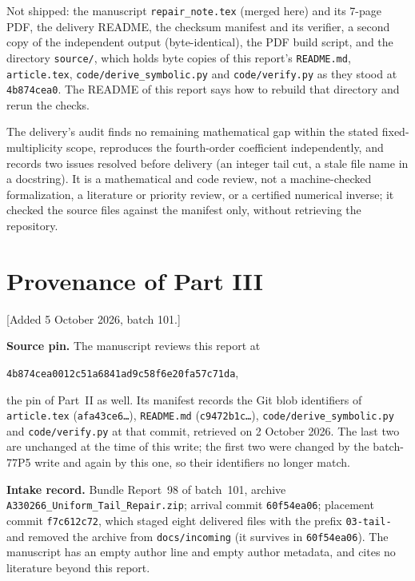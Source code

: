\documentclass[11pt,letterpaper]{article}
\theoremstyle{definition}
\theoremstyle{remark}
\begin{document}
Not shipped: the manuscript \texttt{repair\_note.tex} (merged here) and
its 7-page PDF, the delivery README, the checksum manifest and its
verifier, a second copy of the independent output (byte-identical), the
PDF build script, and the directory \texttt{source/}, which holds byte
copies of this report's \texttt{README.md}, \texttt{article.tex},
\texttt{code/derive\_symbolic.py} and \texttt{code/verify.py} as they
stood at \texttt{4b874cea0}.  The README of this report says how to
rebuild that directory and rerun the checks.

The delivery's audit finds no remaining mathematical gap within the stated
fixed-multiplicity scope, reproduces the fourth-order coefficient
independently, and records two issues resolved before delivery (an
integer tail cut, a stale file name in a docstring).  It is a mathematical
and code review, not a machine-checked formalization, a literature or
priority review, or a certified numerical inverse; it checked the source
files against the manifest only, without retrieving the repository.
\par\endgroup

\section{Provenance of Part III}\label{bsw:ut:sec:provenance}

[Added 5 October 2026, batch 101.]

\textbf{Source pin.}  The manuscript reviews this report at
\begin{center}\small\texttt{4b874cea0012c51a6841ad9c58f6e20fa57c71da},\end{center}
the pin of Part~II as well.  Its manifest records the Git blob identifiers
of \texttt{article.tex} (\texttt{afa43ce6\ldots}), \texttt{README.md}
(\texttt{c9472b1c\ldots}), \texttt{code/derive\_symbolic.py} and
\texttt{code/verify.py} at that commit, retrieved on 2 October 2026.  The
last two are unchanged at the time of this write; the first two were
changed by the batch-77P5 write and again by this one, so their
identifiers no longer match.

\textbf{Intake record.}  Bundle Report~98 of batch~101, archive
\texttt{A330266\_Uniform\_Tail\_Repair.zip}; arrival commit
\texttt{60f54ea06}; placement commit \texttt{f7c612c72}, which staged
eight delivered files with the prefix \texttt{03-tail-} and removed the
archive from \texttt{docs/incoming} (it survives in \texttt{60f54ea06}).
The manuscript has an empty author line and empty author metadata, and
cites no literature beyond this report.
\end{document}
